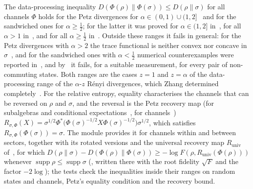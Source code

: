 \documentclass[11pt]{article}
\begin{document}
The data-processing inequality $D(\Phi(\rho)\|\Phi(\sigma))\le D(\rho\|\sigma)$ for all channels $\Phi$ holds for the
Petz divergences for $\alpha\in(0,1)\cup(1,2]$~\cite{petz1986} and for the sandwiched ones for
$\alpha\ge\frac12$; for the latter it was proved for $\alpha\in(1,2]$ in~\cite{mullerlennert2013,wilde2014}, for all
$\alpha>1$ in~\cite{beigi2013}, and for all $\alpha\ge\frac12$ in~\cite{frank2013}. Outside these ranges it fails in
general: for the Petz divergences with $\alpha>2$ the trace functional is neither convex nor concave in
$\sigma$~\cite{mullerlennert2013}, and for the sandwiched ones with $\alpha<\frac12$ numerical counterexamples were
reported in~\cite{mullerlennert2013}, and by~\cite{berta2017} it fails, for a suitable measurement, for every
pair of non-commuting states. Both ranges are the cases $z=1$ and $z=\alpha$ of the data-processing range of the
$\alpha$-$z$ R\'enyi divergences, which Zhang determined completely~\cite{zhang2020}.
For the relative entropy, equality characterises the channels that can be reversed on $\rho$ and $\sigma$, and the
reversal is the Petz recovery map (for subalgebras and conditional expectations~\cite{petz1986suff}, for channels~\cite{petz1988chan})
$R_{\sigma,\Phi}(X)=\sigma^{1/2}\Phi^*\bigl(\Phi(\sigma)^{-1/2}X\Phi(\sigma)^{-1/2}\bigr)\sigma^{1/2}$, which satisfies
$R_{\sigma,\Phi}(\Phi(\sigma))=\sigma$. The module provides it for channels within and between sectors, together with
its rotated versions and the universal recovery map $R_{\mathrm{univ}}$ of~\cite{junge2018}, for which
$D(\rho\|\sigma)-D(\Phi(\rho)\|\Phi(\sigma))\ge-\log F(\rho,R_{\mathrm{univ}}(\Phi(\rho)))$ whenever
$\operatorname{supp}\rho\le\operatorname{supp}\sigma$ (\cite[Remark~2.2]{junge2018}, written there with the root
fidelity $\sqrt F$ and the factor $-2\log$); the tests check the
inequalities inside their ranges on random states and channels, Petz's equality condition and the recovery bound.
\end{document}

